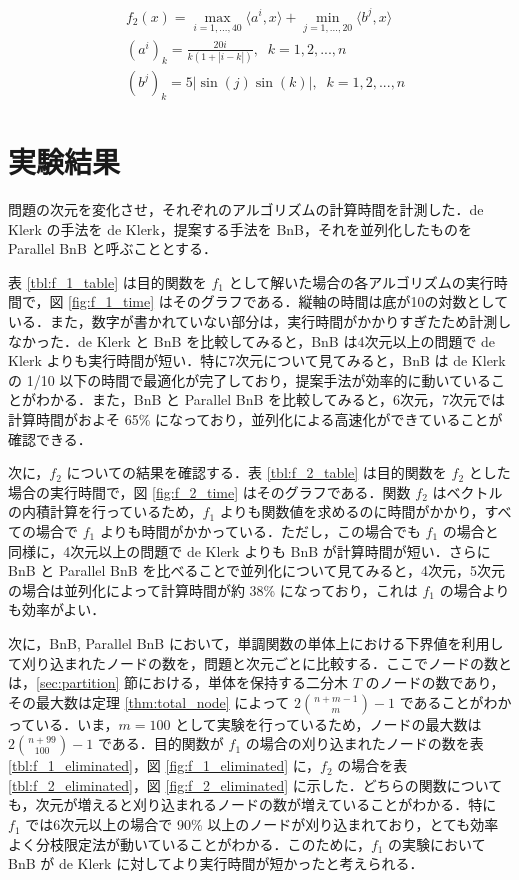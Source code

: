 \documentclass[a4paper,11pt]{jreport}
\begin{document}
\begin{align*}
& f_2(x) = \max_{i = 1, ..., 40} \langle a^i, x \rangle + \min_{j = 1, ..., 20} \langle b^j, x \rangle \\
& (a^i)_k = \frac{20i}{k(1 + | i - k |)}, \;\; k = 1, 2, ..., n \\
& (b^j)_k = 5 | \sin{(j)} \sin{(k)} |, \;\; k = 1, 2, ..., n
\end{align*}
\section{実験結果}

問題の次元を変化させ，それぞれのアルゴリズムの計算時間を計測した．de Klerk の手法を de Klerk，提案する手法を BnB，それを並列化したものを Parallel BnB と呼ぶこととする．\par
表 \ref{tbl:f_1_table} は目的関数を $ f_1 $ として解いた場合の各アルゴリズムの実行時間で，図 \ref{fig:f_1_time} はそのグラフである．縦軸の時間は底が10の対数としている．また，数字が書かれていない部分は，実行時間がかかりすぎたため計測しなかった．de Klerk と BnB を比較してみると，BnB は4次元以上の問題で de Klerk よりも実行時間が短い．特に7次元について見てみると，BnB は de Klerk の 1/10 以下の時間で最適化が完了しており，提案手法が効率的に動いていることがわかる．また，BnB と Parallel BnB を比較してみると，6次元，7次元では計算時間がおよそ 65\% になっており，並列化による高速化ができていることが確認できる．\par
次に，$ f_2 $ についての結果を確認する．表 \ref{tbl:f_2_table} は目的関数を $ f_2 $ とした場合の実行時間で，図 \ref{fig:f_2_time} はそのグラフである．関数 $ f_2 $ はベクトルの内積計算を行っているため，$ f_1 $ よりも関数値を求めるのに時間がかかり，すべての場合で $ f_1 $ よりも時間がかかっている．ただし，この場合でも $ f_1 $ の場合と同様に，4次元以上の問題で de Klerk よりも BnB が計算時間が短い．さらに BnB と Parallel BnB を比べることで並列化について見てみると，4次元，5次元の場合は並列化によって計算時間が約 38\% になっており，これは $ f_1 $ の場合よりも効率がよい．\par
次に，BnB, Parallel BnB において，単調関数の単体上における下界値を利用して刈り込まれたノードの数を，問題と次元ごとに比較する．ここでノードの数とは，\ref{sec:partition} 節における，単体を保持する二分木 $ T $ のノードの数であり，その最大数は定理 \ref{thm:total_node} によって $ 2 \binom{n + m - 1}{m} - 1 $ であることがわかっている．いま，$ m = 100 $ として実験を行っているため，ノードの最大数は $ 2 \binom{n + 99}{100} - 1 $ である．目的関数が $ f_1 $ の場合の刈り込まれたノードの数を表 \ref{tbl:f_1_eliminated}，図 \ref{fig:f_1_eliminated} に，$ f_2 $ の場合を表 \ref{tbl:f_2_eliminated}，図 \ref{fig:f_2_eliminated} に示した．どちらの関数についても，次元が増えると刈り込まれるノードの数が増えていることがわかる．特に $ f_1 $ では6次元以上の場合で 90\% 以上のノードが刈り込まれており，とても効率よく分枝限定法が動いていることがわかる．このために，$ f_1 $ の実験において BnB が de Klerk に対してより実行時間が短かったと考えられる．\par
\end{document}
